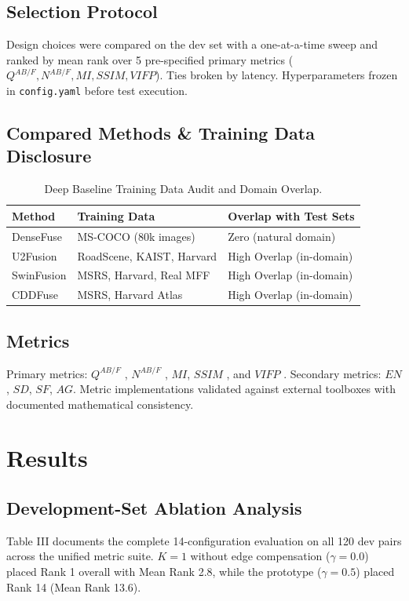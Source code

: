 \documentclass[conference]{IEEEtran}
\begin{document}
\subsection{Selection Protocol}
Design choices were compared on the dev set with a one-at-a-time sweep and ranked by mean rank over 5 pre-specified primary metrics ($Q^{AB/F}, N^{AB/F}, MI, SSIM, VIFP$). Ties broken by latency. Hyperparameters frozen in \texttt{config.yaml} before test execution.

\subsection{Compared Methods \& Training Data Disclosure}
\begin{table}[htbp]
\caption{Deep Baseline Training Data Audit and Domain Overlap.}
\begin{center}
\begin{tabular}{lll}
\toprule
\textbf{Method} & \textbf{Training Data} & \textbf{Overlap with Test Sets} \\
\midrule
DenseFuse \cite{ref_densefuse} & MS-COCO (80k images) & Zero (natural domain) \\
U2Fusion \cite{ref_u2fusion} & RoadScene, KAIST, Harvard & High Overlap (in-domain) \\
SwinFusion \cite{ref_swinfusion} & MSRS, Harvard, Real MFF & High Overlap (in-domain) \\
CDDFuse \cite{ref_cddfuse} & MSRS, Harvard Atlas & High Overlap (in-domain) \\
\bottomrule
\end{tabular}
\end{center}
\end{table}

\subsection{Metrics}
Primary metrics: $Q^{AB/F}$ \cite{ref_qabf}, $N^{AB/F}$ \cite{ref_nabf}, $MI$, $SSIM$ \cite{ref_ssim}, and $VIFP$ \cite{ref_vif}. Secondary metrics: $EN$, $SD$, $SF$, $AG$. Metric implementations validated against external toolboxes with documented mathematical consistency.

\section{Results}
\subsection{Development-Set Ablation Analysis}
Table III documents the complete 14-configuration evaluation on all 120 dev pairs across the unified metric suite. $K=1$ without edge compensation ($\gamma=0.0$) placed Rank 1 overall with Mean Rank 2.8, while the prototype ($\gamma=0.5$) placed Rank 14 (Mean Rank 13.6).
\end{document}
